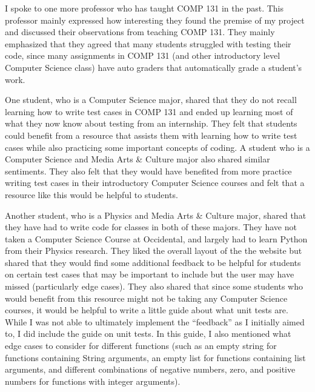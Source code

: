 \documentclass[10pt,twocolumn]{article}
\begin{document}
I spoke to one more professor who has taught COMP 131 in the past. This professor mainly expressed how interesting they found the premise of my project and discussed their observations from teaching COMP 131. They mainly emphasized that they agreed that many students struggled with testing their code, since many assignments in COMP 131 (and other introductory level Computer Science class) have auto graders that automatically grade a student's work.

One student, who is a Computer Science major, shared that they do not recall learning how to write test cases in COMP 131 and ended up learning most of what they now know about testing from an internship. They felt that students could benefit from a resource that assists them with learning how to write test cases while also practicing some important concepts of coding. A student who is a Computer Science and Media Arts \& Culture major also shared similar sentiments. They also felt that they would have benefited from more practice writing test cases in their introductory Computer Science courses and felt that a resource like this would be helpful to students.

Another student, who is a Physics and Media Arts \& Culture major, shared that they have had to write code for classes in both of these majors. They have not taken a Computer Science Course at Occidental, and largely had to learn Python from their Physics research. They liked the overall layout of the the website but shared that they would find some additional feedback to be helpful for students on certain test cases that may be important to include but the user may have missed (particularly edge cases). They also shared that since some students who would benefit from this resource might not be taking any Computer Science courses, it would be helpful to write a little guide about what unit tests are. While I was not able to ultimately implement the \enquote{feedback} as I initially aimed to, I did include the guide on unit tests. In this guide, I also mentioned what edge cases to consider for different functions (such as an empty string for functions containing String arguments, an empty list for functions containing list arguments, and different combinations of negative numbers, zero, and positive numbers for functions with integer arguments). 
\end{document}

